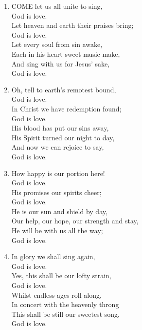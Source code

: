 \documentclass[11pt,a4paper]{article}
\begin{document}
\begin{enumerate}
    \item COME let us all unite to sing, \\
        God is love. \\
        Let heaven and earth their praises bring; \\
        God is love. \\
        Let every soul from sin awake, \\
        Each in his heart sweet music make, \\
        And sing with us for Jesus' sake, \\
        God is love.

    \item Oh, tell to earth's remotest bound, \\
        God is love. \\
        In Christ we have redemption found; \\
        God is love. \\
        His blood has put our sins away, \\
        His Spirit turned our night to day, \\
        And now we can rejoice to say, \\
        God is love.

    \item How happy is our portion here! \\
        God is love. \\
        His promises our spirits cheer; \\
        God is love. \\
        He is our sun and shield by day, \\
        Our help, our hope, our strength and stay, \\
        He will be with us all the way; \\
        God is love.

    \item In glory we shall sing again, \\
        God is love. \\
        Yes, this shall be our lofty strain, \\
        God is love. \\
        Whilst endless ages roll along, \\
        In concert with the heavenly throng \\
        This shall be still our sweetest song, \\
        God is love.

\end{enumerate}
\end{document}
